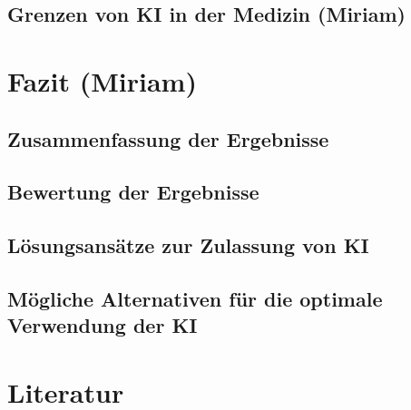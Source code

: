 \documentclass[a4paper, 11pt]{article}
\begin{document}
			\subsection{Grenzen von KI in der Medizin  \small{(Miriam)}}\label{sec:ki-limitations}
				
	
	\newpage
	\section{Fazit \small{(Miriam)}}\label{sec:conclusion}
		
		\subsection{Zusammenfassung der Ergebnisse}\label{sec:summary}
			
		\subsection{Bewertung der Ergebnisse}\label{sec:rating}
			
		\subsection{Lösungsansätze zur Zulassung von KI}\label{sec:solutions}
			
		\subsection{Mögliche Alternativen für die optimale Verwendung der KI}\label{sec:alternatives}
			
	  

    \newpage
    \printglossary[type=\acronymtype,title={Akronyme}]
   
    \newpage
    \section*{Literatur}
    \nocite{*}
    \printbibliography{}
	
    \newpage
    \printglossary[type=main,title={Glossar}]
\end{document}
